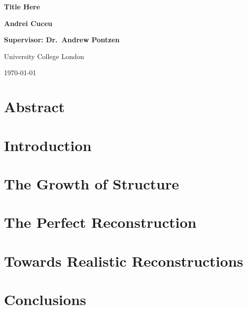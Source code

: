 \documentclass[12pt,aas_macros,twoside]{report}
\begin{document}
\begin{titlepage}
    \begin{center}
        
        \vspace*{5cm}
        {\fontsize{50}{60}\selectfont \textbf{Title Here}}
        
        
        \vspace{3cm}
        
        \Huge
        \textbf{Andrei Cuceu}
        
        
        \vspace{1cm}
        
        \huge
        \textbf{Supervisor: Dr.\ Andrew Pontzen}
        
        \vspace{8cm}
        
        \huge
        University College London
        
        \vspace{1cm}
        \huge
        \today
        
    \end{center}
\end{titlepage}



\chapter*{\Huge Abstract}

\cite{Eisenstein_BAOpeak_reconstruction}

\tableofcontents

\newpage
\chapter{Introduction}


\newpage
\chapter{The Growth of Structure}


% 

\newpage
\chapter{The Perfect Reconstruction}


\newpage
\chapter{Towards Realistic Reconstructions}


\newpage
\chapter{Conclusions}


\printbibliography{}
\end{document}
